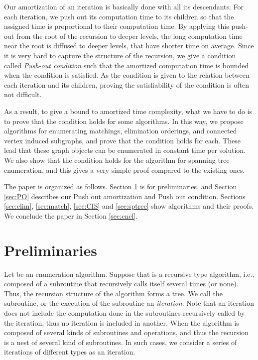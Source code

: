 \documentclass{llncs}
\begin{document}
Our amortization of an iteration is basically done with all its descendants.
For each iteration, we push out its computation time to its children 
 so that the assigned time is proportional to their computation time.
By applying this push-out from the root of the recursion to deeper levels,
 the long computation time near the root is diffused to deeper levels,
 that have shorter time on average.
Since it is very hard to capture the structure of the recursion, we give a
 condition called {\em Push-out condition} such that the amortized
 computation time is bounded when the condition is satisfied.
As the condition is given to the relation between each iteration and its
 children, proving the satisfiability of the condition is often not difficult.

As a result, to give a bound to amortized time complexity, what we have
 to do is to prove that the condition holds for some algorithms.
In this way, we propose algorithms for enumerating matchings,
 elimination orderings, and connected vertex induced subgraphs, and 
 prove that the condition holds for each.
These lead that these graph objects can be enumerated in constant time per
 solution.
We also show that the condition holds for the algorithm for spanning tree
 enumeration, and this gives a very simple proof compared to the existing
 ones.

The paper is organized as follows.
Section \ref{sec:prlm} is for preliminaries, and Section \ref{sec:PO} describes
 our Push out amortization and Push out condition.
Sections \ref{sec:elim}, \ref{sec:match}, \ref{sec:CIS} and \ref{sec:sptree}
 show algorithms and their proofs.
We conclude the paper in Section \ref{sec:cncl}.


\vspace{-2mm}
\section{Preliminaries}\label{sec:prlm}
\vspace{-2mm}

Let  be an enumeration algorithm.
Suppose that  is a recursive type algorithm, i.e., composed of 
 a subroutine that recursively calls itself several times (or none).
Thus, the recursion structure of the algorithm forms a tree.
We call the subroutine, or the execution of the subroutine an
 {\em iteration}.
Note that an iteration does not include the computation done in the 
 subroutines recursively called by the iteration, thus no iteration is
 included in another.
When the algorithm is composed of several kinds of subroutines and
 operations, and thus the recursion is a nest of several kind of subroutines.
In such cases, we consider a series of iterations of different types as 
 an iteration.
\end{document}
